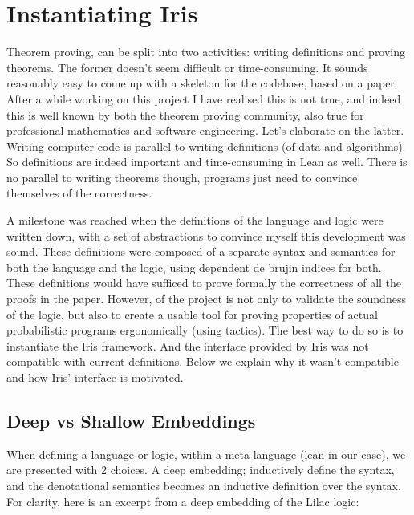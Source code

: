 
\section{Instantiating Iris}
Theorem proving, can be split into two activities: writing definitions and proving theorems. The former doesn't seem difficult or time-consuming. It sounds reasonably
easy to come up with a skeleton for the codebase, based on a paper. After a while working on this project I have realised this is not true, and indeed this is well known
by both the theorem proving community, also true for professional mathematics and software engineering. Let's elaborate on the latter. Writing computer code is parallel
to writing definitions (of data and algorithms). So definitions are indeed important and time-consuming in Lean as well. There is no parallel to writing theorems though, programs just need to convince themselves of the correctness.

A milestone was reached when the definitions of the language and logic were written down, with a set of abstractions to convince myself this development was sound.
These definitions were composed of a separate syntax and semantics for both the language and the logic, using dependent de brujin indices for both. These definitions
would have sufficed to prove formally the correctness of all the proofs in the paper. However, of the project is not only to validate the soundness of the logic,
but also to create a usable tool for proving properties of actual probabilistic programs ergonomically (using tactics). The best way to do so is to instantiate the Iris
framework. And the interface provided by Iris was not compatible with current definitions. Below we explain why it wasn't compatible and how Iris' interface is motivated.

\subsection{Deep vs Shallow Embeddings}
When defining a language or logic, within a meta-language (lean in our case), we are presented with 2 choices. A deep embedding; inductively define the syntax,
and the denotational semantics becomes an inductive definition over the syntax. For clarity, here is an excerpt from a deep embedding of the Lilac logic:



